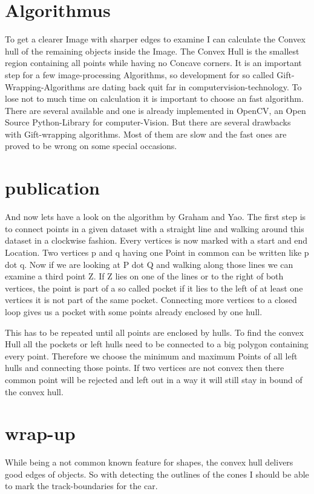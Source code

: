 \documentclass[10pt,a4paper]{article}
\begin{document}
	\section{Algorithmus}
	To get a clearer Image with sharper edges to examine I can calculate the Convex hull of the remaining objects inside the Image.
	The Convex Hull is the smallest region containing all points while having no Concave corners.
	It is an important step for a few image-processing Algorithms, so development for so called Gift-Wrapping-Algorithms are dating back quit far in computervision-technology.	
	To lose not to much time on calculation it is important to choose an fast algorithm.
	There are several available and one is already implemented in OpenCV, an Open Source Python-Library for computer-Vision.
	But there are several drawbacks with Gift-wrapping algorithms.
	Most of them are slow and the fast ones are proved to be wrong on some special occasions.
	
	\section{publication}
	And now lets have a look on the algorithm by Graham and Yao.
	The first step is to connect points in a given dataset with a straight line and walking around this dataset in a clockwise fashion.  
	Every vertices is now marked with a start and end Location.
	Two vertices p and q having one Point in common can be written like p dot q.
	Now if we are looking at P dot Q and walking along those lines we can examine a third point Z.
	If Z lies on one of the lines or to the right of both vertices, the point is part of a so called pocket 
	if it lies to the left of at least one vertices it is not part of the same pocket.
	Connecting more vertices to a closed loop gives us a pocket with some points already enclosed by one hull.
	
	This has to be repeated until all points are enclosed by hulls. To find the convex Hull all the pockets or left hulls need to be connected to a big polygon containing every point.
	Therefore we choose the minimum and maximum Points of all left hulls and connecting those points. If two vertices are not convex then there common point will be rejected and left out in a way it will still stay in bound of the convex hull.
		
	
	\section{wrap-up}
	While being a not common known feature for shapes, the convex hull delivers good edges of objects. 
	So with detecting the outlines of the cones I should be able to mark the track-boundaries for the car.
	
\end{document}

